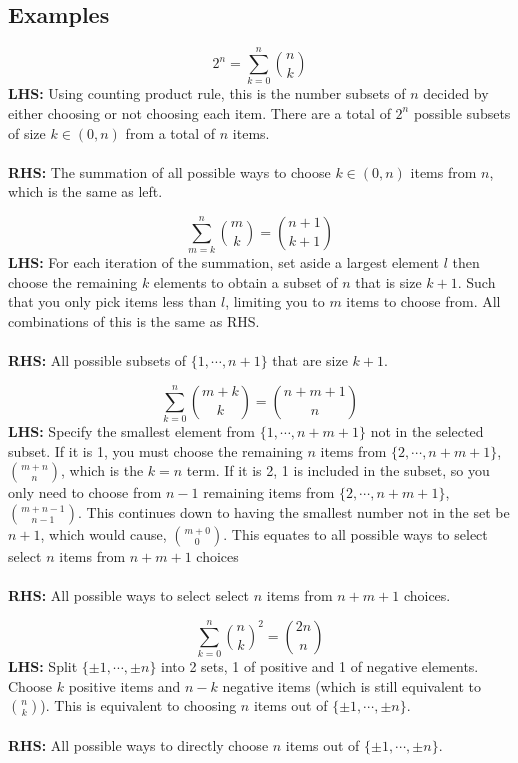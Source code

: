 \documentclass{article}\usepackage{amsmath,amssymb,amsthm,tikz,tkz-graph,color,chngpage,soul,hyperref,csquotes,graphicx,floatrow, listings}\newcommand*{\QEDB}{\hfill\ensuremath{\square}}\newtheorem*{prop}{Proposition}\renewcommand{\theenumi}{\alph{enumi}}\usepackage[shortlabels]{enumitem}\usepackage[nobreak=true]{mdframed}\usetikzlibrary{matrix,calc}\MakeOuterQuote{"}\usepackage[margin=0.75in]{geometry} \newtheorem{theorem}{Theorem}\newcommand{\Z}{\mathbb Z}\newcommand{\R}{\mathbb R}\newcommand{\Q}{\mathbb Q}\newcommand{\N}{\mathbb N}\newcommand{\x}[1]{\textrm{ #1 }}\newcommand{\pr}{\textrm{Pr}}
\newcommand{\sumlim}[3]{\sum\limits_{#1}^{#2}#3}
\newcommand{\eq}[1]{\begin{equation}#1\end{equation}}
\begin{document}
\subsection*{Examples}
\begin{mdframed}
\begin{equation}2^n=\sumlim{k=0}{n}{\binom{n}{k}}\end{equation}
\textbf{LHS:} Using counting product rule, this is the number subsets of $n$ decided by either choosing or not choosing each item. There are a total of $2^n$ possible subsets of size $k \in (0,n)$ from a total of $n$ items.\\\\
\textbf{RHS:} The summation of all possible ways to choose $k \in (0,n)$ items from $n$, which is the same as left.
\end{mdframed}
\begin{mdframed}
\begin{equation}\sumlim{m=k}{n}{\binom{m}{k}}=\binom{n+1}{k+1}\end{equation}
\textbf{LHS:} For each iteration of the summation, set aside a largest element $l$ then choose the remaining $k$ elements to obtain a subset of $n$ that is size $k+1$. Such that you only pick items less than $l$, limiting you to $m$ items to choose from. All combinations of this is the same as RHS.\\\\
\textbf{RHS:} All possible subsets of $\{1,\cdots,n+1\}$ that are size $k+1$.
\end{mdframed}
\begin{mdframed}
\eq{\sumlim{k=0}{n}{\binom{m+k}{k}}=\binom{n+m+1}{n}}
\textbf{LHS:} Specify the smallest element from $\{1,\cdots,n+m+1\}$ not in the selected subset. If it is 1, you must choose the remaining $n$ items from $\{2,\cdots,n+m+1\}$, $\binom{m+n}{n}$, which is the $k=n$ term. If it is 2, 1 is included in the subset, so you only need to choose from $n-1$ remaining items from $\{2,\cdots,n+m+1\}$, $\binom{m+n-1}{n-1}$. This continues down to having the smallest number not in the set be $n+1$, which would cause, $\binom{m+0}{0}$. This equates to all possible ways to select select $n$ items from $n+m+1$ choices\\\\
\textbf{RHS:} All possible ways to select select $n$ items from $n+m+1$ choices.
\end{mdframed}
\begin{mdframed}
\eq{\sumlim{k=0}{n}{\binom{n}{k}^2}=\binom{2n}{n}}
\textbf{LHS:} Split $\{\pm1,\cdots,\pm n\}$ into 2 sets, 1 of positive and 1 of negative elements. Choose $k$ positive items and $n-k$ negative items (which is still equivalent to $\binom{n}{k}$). This is equivalent to choosing $n$ items out of $\{\pm1,\cdots,\pm n\}$.\\\\
\textbf{RHS:} All possible ways to directly choose $n$ items out of $\{\pm1,\cdots,\pm n\}$.
\end{mdframed}
\end{document}
